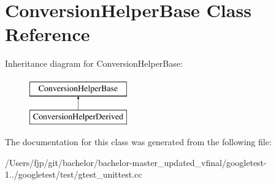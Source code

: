 \hypertarget{class_conversion_helper_base}{}\section{Conversion\+Helper\+Base Class Reference}
\label{class_conversion_helper_base}
Inheritance diagram for Conversion\+Helper\+Base\+:\begin{figure}[H]
\begin{center}
\leavevmode
\includegraphics[height=2.000000cm]{class_conversion_helper_base}
\end{center}
\end{figure}


The documentation for this class was generated from the following file\+:\begin{DoxyCompactItemize}
\item 
/\+Users/fjp/git/bachelor/bachelor-\/master\+\_\+updated\+\_\+vfinal/googletest-\/1../googletest/test/gtest\+\_\+unittest.\+cc\end{DoxyCompactItemize}
